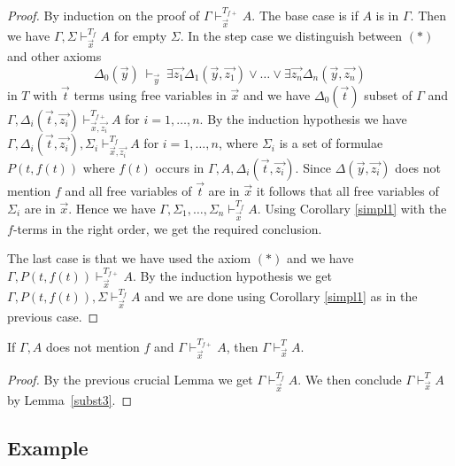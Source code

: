 \documentclass[10pt,a4paper]{article}
\begin{document}
\begin{proof}
By induction on the proof of $\Gamma\vdash_{\vec{x}}^{T_{f{+}}} A$.
The base case is if $A$ is in $\Gamma$. Then we have
$\Gamma,\Sigma\vdash_{\vec{x}}^{T_f} A$ for empty $\Sigma$.
In the step case we distinguish between $(*)$ and other axioms
$$
\Delta_0(\vec{y})~\vdash_{\vec{y}}~
\exists \vec{z_1}\Delta_1(\vec{y},\vec{z_1})\vee\dots\vee\exists \vec{z_n}\Delta_n(\vec{y},\vec{z_n})
$$
in $T$ with $\vec{t}$ terms using free variables in $\vec{x}$ and
we have $\Delta_0(\vec{t})$ subset of $\Gamma$ and
$\Gamma,\Delta_i(\vec{t},\vec{z_i})\vdash_{\vec{x},\vec{z_i}}^{T_{f{+}}} A$ for $i=1,\dots,n$.
By the induction hypothesis we have $\Gamma,\Delta_i(\vec{t},\vec{z_i}), \Sigma_i\vdash_{\vec{x},\vec{z_i}}^{T_f} A$
for $i = 1,\dots,n$, where $\Sigma_i$ is a set of formulae $P(t,f(t))$ where
$f(t)$ occurs in $\Gamma,A,\Delta_i(\vec{t},\vec{z_i})$.
Since $\Delta(\vec{y},\vec{z_i})$ does not mention $f$ and all free variables of $\vec{t}$ are
in $\vec{x}$ it follows that all free variables of $\Sigma_i$ are in $\vec{x}$.
Hence we have $\Gamma,\Sigma_1,\dots,\Sigma_n\vdash_{\vec{x}}^{T_f} A$.
Using Corollary \ref{simpl1} with the $f$-terms in the right order, 
we get the required conclusion.

The last case is that we have used the axiom $(*)$ and
we have $\Gamma,P(t,f(t))\vdash_{\vec{x}}^{T_{f{+}}} A$. By the induction hypothesis we get
$\Gamma,P(t,f(t)),\Sigma \vdash_{\vec{x}}^{T_f} A$ and we are
done using Corollary \ref{simpl1} as in the previous case.
\end{proof}

\begin{theorem}\label{thm:skolem}
If $\Gamma,A$ does not mention $f$ and $\Gamma\vdash_{\vec{x}}^{T_{f{+}}} A$, then
$\Gamma\vdash_{\vec{x}}^T A$.
\end{theorem}

\begin{proof}
By the previous crucial Lemma we get $\Gamma\vdash_{\vec{x}}^{T_f} A$. We then conclude
$\Gamma\vdash_{\vec{x}}^T A$ by Lemma~\ref{subst3}.
\end{proof}

\subsection{Example}
\end{document}
